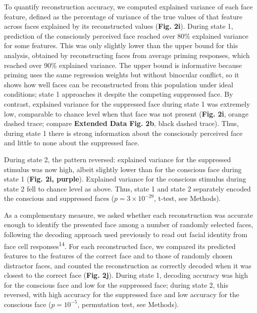 \documentclass{article}
\begin{document}
To quantify reconstruction accuracy, we computed explained variance of each face feature, defined as the percentage of variance of the true values of that feature across faces explained by its reconstructed values (\textbf{Fig. 2i}). During state 1, prediction of the consciously perceived face reached over 80\% explained variance for some features. This was only slightly lower than the upper bound for this analysis, obtained by reconstructing faces from average priming responses, which reached over 90\% explained variance. The upper bound is informative because priming uses the same regression weights but without binocular conflict, so it shows how well faces can be reconstructed from this population under ideal conditions; state 1 approaches it despite the competing suppressed face. By contrast, explained variance for the suppressed face during state 1 was extremely low, comparable to chance level when that face was not present (\textbf{Fig. 2i}, orange dashed trace; compare \textbf{Extended Data Fig. 2b}, black dashed trace). Thus, during state 1 there is strong information about the consciously perceived face and little to none about the suppressed face.

During state 2, the pattern reversed: explained variance for the suppressed stimulus was now high, albeit slightly lower than for the conscious face during state 1 (\textbf{Fig. 2i, purple}). Explained variance for the conscious stimulus during state 2 fell to chance level as above. Thus, state 1 and state 2 separately encoded the conscious and suppressed faces ($p = 3 \times 10^{-29}$, t-test, see Methods).

As a complementary measure, we asked whether each reconstruction was accurate enough to identify the presented face among a number of randomly selected faces, following the decoding approach used previously to read out facial identity from face cell responses\textsuperscript{14}. For each reconstructed face, we compared its predicted features to the features of the correct face and to those of randomly chosen distractor faces, and counted the reconstruction as correctly decoded when it was closest to the correct face (\textbf{Fig. 2j}). During state 1, decoding accuracy was high for the conscious face and low for the suppressed face; during state 2, this reversed, with high accuracy for the suppressed face and low accuracy for the conscious face ($p = 10^{-5}$, permutation test, see Methods).
\end{document}
